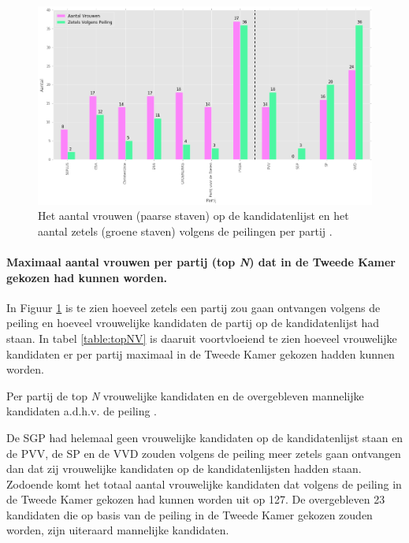 \begin{figure}[H]

	\includegraphics[width=\linewidth]	{Aantal_vrouwen_aantal_zetels1.png}

			\caption{Het aantal vrouwen (paarse staven) op de kandidatenlijst \citep{Kiesraad_kandidatenlijsten} en het aantal zetels (groene staven) volgens de peilingen per partij \citep{IPSOS}.}

	\label{fig:zetelsV}
\end{figure}

\paragraph{Maximaal aantal vrouwen per partij (top \textit{N}) dat in de Tweede Kamer gekozen had kunnen worden.}
In Figuur \ref{fig:zetelsV} is te zien hoeveel zetels een partij zou gaan ontvangen volgens de peiling en hoeveel vrouwelijke kandidaten de partij op de kandidatenlijst had staan. In tabel \ref{table:topNV} is daaruit voortvloeiend te zien hoeveel vrouwelijke kandidaten er per partij maximaal in de Tweede Kamer gekozen hadden kunnen worden.  


\begin{table}[h]
\centering
	\begin{footnotesize}
		
	\end{footnotesize}
			\caption{Per partij de top \textit{N} vrouwelijke kandidaten en de overgebleven mannelijke kandidaten a.d.h.v. de peiling \citep{IPSOS}.}
\label{table:topNV} 
\end{table}

De SGP had helemaal geen vrouwelijke kandidaten op de kandidatenlijst staan en de PVV, de SP en de VVD zouden volgens de peiling meer zetels gaan ontvangen dan dat zij vrouwelijke kandidaten op de kandidatenlijsten hadden staan. Zodoende komt het totaal aantal vrouwelijke kandidaten dat volgens de peiling in de Tweede Kamer gekozen had kunnen worden uit op 127. De overgebleven 23 kandidaten die op basis van de peiling in de Tweede Kamer gekozen zouden worden, zijn uiteraard mannelijke kandidaten.

